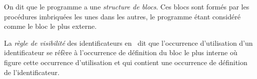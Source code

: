{\begin{minipage}{\myparboxwidth}
{\vspace{\neglskip}\mbox{}\par
\vspace{0.3\baselineskip}
\vspace{\neglskip}\mbox{}\par
\vspace{0.3\baselineskip}
\vspace{\neglskip}\mbox{}\par
\vspace{\neglskip}\mbox{\blc \blk{}}\par
\vspace{\neglskip}\mbox{\blc \blk\blk\blk{}}\par
\vspace{\neglskip}\mbox{\blc \blk\blk\blk{}}\par
\vspace{\neglskip}\mbox{\blc \blk\blk\blk{}}\par
\vspace{\neglskip}\mbox{\blc \blk{}}\par
\vspace{\neglskip}\mbox{\blc \blk{}}\par
\vspace{\neglskip}\mbox{\blc \blk{}}\par
\vspace{0.3\baselineskip}
\vspace{\neglskip}\mbox{}\par
\vspace{\neglskip}\mbox{}\par
\vspace{\neglskip}\mbox{}\par

\medskip }

On dit que le programme a une {\em structure de blocs}. Ces blocs sont formés par les procédures imbriquées 
 les unes dans les autres, le programme étant  considéré comme le bloc le plus externe. 
 
 La {\em règle de 
 visibilité} des identificateurs en \python\ dit que l'occurrence d'utilisation d'un identificateur
 se réfère à l'occurrence de définition du bloc le plus interne où figure cette occurrence d'utilisation et
 qui contient une occurrence de définition de l'identificateur. 

\vspace{\abovedisplayskip}
\end{minipage}
}
